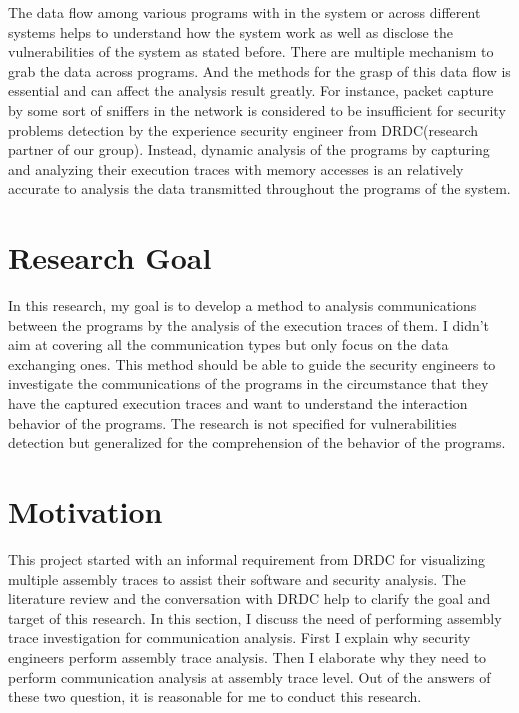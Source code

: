 The data flow among various programs with in the system or across different systems helps to understand how the system work as well as disclose the vulnerabilities of the system as stated before. There are multiple mechanism to grab the data across programs. And the methods for the grasp of this data flow is essential and can affect the analysis result greatly. For instance, packet capture by some sort of sniffers in the network is considered to be insufficient for security problems detection by the experience security engineer from DRDC(research partner of our group). Instead, dynamic analysis of the programs by capturing and analyzing their execution traces with memory accesses is an relatively accurate to analysis the data transmitted throughout the programs of the system. 

\section{Research Goal}
In this research, my goal is to develop a method to analysis communications between the programs by the analysis of the execution traces of them. I didn't aim at covering all the communication types but only focus on the data exchanging ones. This method should be able to guide the security engineers to investigate the communications of the programs in the circumstance that they have the captured execution traces and want to understand the interaction behavior of the programs. The research is not specified for vulnerabilities detection but generalized for the comprehension of the behavior of the programs.

\section{Motivation}
This project started with an informal requirement from DRDC for visualizing multiple assembly traces to assist their software and security analysis. The literature review and the conversation with DRDC help to clarify the goal and target of this research. In this section, I discuss the need of performing assembly trace investigation for communication analysis. First I explain why security engineers perform assembly trace analysis. Then I elaborate why they need to perform communication analysis at assembly trace level. Out of the answers of these two question, it is reasonable for me to conduct this research.

